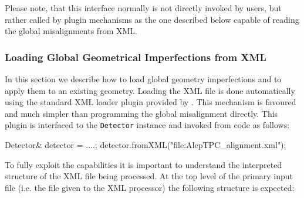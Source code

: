 \documentclass[10pt,a4paper]{article}
\begin{document}
\noindent
Please note, that this interface normally is not directly invoked
by users, but rather called by plugin mechanisms as the one described below
capable of reading the global misalignments from XML.

\noindent
\subsubsection{Loading Global Geometrical Imperfections from XML}
\label{sec:ddalign-user-manual-global-misalignment-manip-xml}
\noindent
In this section we describe how to load global geometry 
imperfections and to apply them
to an existing geometry. Loading the XML file is done automatically using the 
standard XML loader plugin provided by \DDhep. This mechanism is favoured and 
much simpler than programming the global misalignment directly.
This plugin is interfaced to 
the {\tt Detector} instance and invoked from code as follows:
\begin{code}
    Detector& detector = ....;
    detector.fromXML("file:AlepTPC_alignment.xml");
\end{code}
To fully exploit the capabilities it is important to understand the interpreted 
structure of the XML file being processed. At the top level of the primary 
input file (i.e. the file given to the XML processor) the following structure 
is expected:
\end{document}
